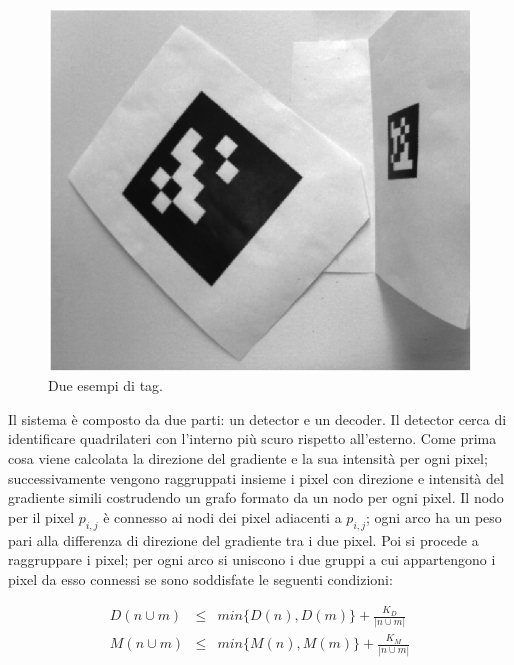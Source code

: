 \documentclass[10pt,twocolumn]{article}
\begin{document}
  \begin{figure}[h]
    \centering
    \includegraphics[width=\linewidth]{immagini/apriltag.png}
    \caption{Due esempi di tag.}
    \label{f:apriltag}
  \end{figure}
  
  Il sistema è composto da due parti: un detector e un decoder. Il detector
  cerca di identificare quadrilateri con l'interno più scuro rispetto
  all'esterno. Come prima cosa viene calcolata la direzione del gradiente e la
  sua intensità per ogni pixel; successivamente vengono raggruppati insieme i
  pixel con direzione e intensità del gradiente simili costrudendo un grafo
  formato da un nodo per ogni pixel. Il nodo per il pixel $p_{i,j}$ è connesso
  ai nodi dei pixel adiacenti a $p_{i,j}$; ogni arco ha un peso pari alla
  differenza di direzione del gradiente tra i due pixel. Poi si procede a
  raggruppare i pixel; per ogni arco si uniscono i due gruppi a cui appartengono
  i pixel da esso connessi se sono soddisfate le seguenti condizioni:
  
  \begin{eqnarray}
    D(n \cup m) & \leq & min\{D(n), D(m)\} + \frac{K_D}{|n \cup m|} \\
    M(n \cup m) & \leq & min\{M(n), M(m)\} + \frac{K_M}{|n \cup m|} 
  \end{eqnarray}
\end{document}
